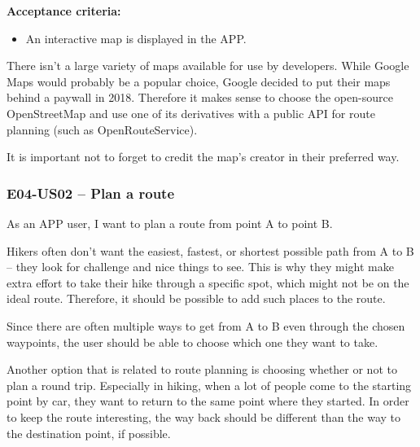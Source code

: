\textbf{Acceptance criteria:}
\begin{itemize}
    \item An interactive map is displayed in the APP.
\end{itemize}

There isn't a large variety of maps available for use by developers.
While Google Maps would probably be a popular choice, Google decided to put their maps behind a paywall\cite{google-maps-paywall} in 2018.
Therefore it makes sense to choose the open-source OpenStreetMap\cite{OpenStreetMap} and use one of its derivatives with a public API for route planning (such as OpenRouteService\cite{OpenRouteService}).

It is important not to forget to credit the map's creator in their preferred way.

\subsubsection*{E04-US02 -- Plan a route}
As an APP user, I want to plan a route from point A to point B.

Hikers often don't want the easiest, fastest, or shortest possible path from A to B -- they look for challenge and nice things to see.
This is why they might make extra effort to take their hike through a specific spot, which might not be on the ideal route.
Therefore, it should be possible to add such places to the route.

Since there are often multiple ways to get from A to B even through the chosen waypoints, the user should be able to choose which one they want to take.

Another option that is related to route planning is choosing whether or not to plan a round trip.
Especially in hiking, when a lot of people come to the starting point by car, they want to return to the same point where they started.
In order to keep the route interesting, the way back should be different than the way to the destination point, if possible.

